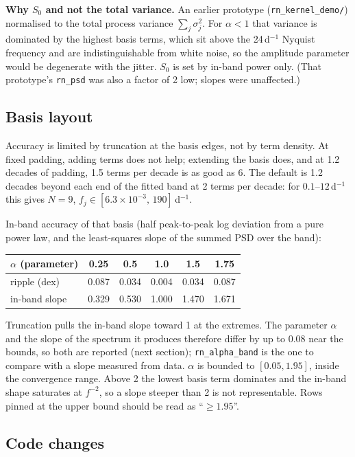 \documentclass[11pt]{article}
\newcommand{\code}[1]{\texttt{#1}}
\begin{document}
\textbf{Why $S_0$ and not the total variance.} An earlier prototype
(\code{rn\_kernel\_demo/}) normalised to the total process variance
$\sum_j\sigma_j^2$. For $\alpha<1$ that variance is dominated by the highest basis
terms, which sit above the 24\,d$^{-1}$ Nyquist frequency and are indistinguishable from
white noise, so the amplitude parameter would be degenerate with the jitter. $S_0$ is
set by in-band power only. (That prototype's \code{rn\_psd} was also a factor of 2 low;
slopes were unaffected.)

\subsection{Basis layout}

Accuracy is limited by truncation at the basis edges, not by term density. At fixed
padding, adding terms does not help; extending the basis does, and at 1.2 decades of
padding, 1.5 terms per decade is as good as 6. The default is 1.2 decades beyond each end
of the fitted band at 2 terms per decade: for $0.1$--$12$\,d$^{-1}$ this gives $N=9$,
$f_j \in [6.3\times10^{-3},\,190]$\,d$^{-1}$.

In-band accuracy of that basis (half peak-to-peak log deviation from a pure power law, and
the least-squares slope of the summed PSD over the band):

\begin{center}
\begin{tabular}{lccccc}
\toprule
$\alpha$ (parameter) & 0.25 & 0.5 & 1.0 & 1.5 & 1.75 \\
\midrule
ripple (dex)          & 0.087 & 0.034 & 0.004 & 0.034 & 0.087 \\
in-band slope         & 0.329 & 0.530 & 1.000 & 1.470 & 1.671 \\
\bottomrule
\end{tabular}
\end{center}

Truncation pulls the in-band slope toward 1 at the extremes. The parameter $\alpha$ and
the slope of the spectrum it produces therefore differ by up to 0.08 near the bounds, so
both are reported (next section); \code{rn\_alpha\_band} is the one to compare with a
slope measured from data. $\alpha$ is bounded to $[0.05, 1.95]$, inside the convergence
range. Above 2 the lowest basis term dominates and the in-band shape saturates at
$f^{-2}$, so a slope steeper than 2 is not representable. Rows pinned at the upper
bound should be read as ``$\geq 1.95$''.

\subsection{Code changes}
\end{document}
